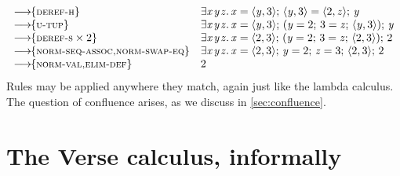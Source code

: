 \documentclass[acmsmall,review,anonymous,dvipsnames]{acmart}
\newcommand{\Varid}[1]{\mathit{#1}}
\begin{document}
$$
\begin{array}{ll}
\movestoR{deref-h}       & \ensuremath{\exists\Varid{x}\hspace{0.3mm}\Varid{y}\hspace{0.3mm}\Varid{z}.\,\Varid{x}\mathrel{=}\langle{}\Varid{y},\mathrm{3}\rangle;\,\langle{}\Varid{y},\mathrm{3}\rangle\mathrel{=}\langle{}\mathrm{2},\Varid{z}\rangle;\,\Varid{y}} \\
\movestoR{u-tup}          & \ensuremath{\exists\Varid{x}\hspace{0.3mm}\Varid{y}\hspace{0.3mm}\Varid{z}.\,\Varid{x}\mathrel{=}\langle{}\Varid{y},\mathrm{3}\rangle;\,(\Varid{y}\mathrel{=}\mathrm{2};\,\mathrm{3}\mathrel{=}\Varid{z};\,\langle{}\Varid{y},\mathrm{3}\rangle);\,\Varid{y}} \\
\movestoRn{deref-s}{2}  & \ensuremath{\exists\Varid{x}\hspace{0.3mm}\Varid{y}\hspace{0.3mm}\Varid{z}.\,\Varid{x}\mathrel{=}\langle{}\mathrm{2},\mathrm{3}\rangle;\,(\Varid{y}\mathrel{=}\mathrm{2};\,\mathrm{3}\mathrel{=}\Varid{z};\,\langle{}\mathrm{2},\mathrm{3}\rangle);\,\mathrm{2}} \\
\movestoR{norm-seq-assoc,norm-swap-eq}  & \ensuremath{\exists\Varid{x}\hspace{0.3mm}\Varid{y}\hspace{0.3mm}\Varid{z}.\,\Varid{x}\mathrel{=}\langle{}\mathrm{2},\mathrm{3}\rangle;\,\Varid{y}\mathrel{=}\mathrm{2};\,\Varid{z}\mathrel{=}\mathrm{3};\,\langle{}\mathrm{2},\mathrm{3}\rangle;\,\mathrm{2}} \\
\movestoR{norm-val,elim-def}     & \ensuremath{\mathrm{2}}
\end{array}
$$
%
Rules may be applied anywhere they match, again just like the lambda calculus. The question of confluence arises, as we discuss in \cref{sec:confluence}.


\section{The Verse calculus, informally} \label{sec:informal}

\figureSyntax
\end{document}
